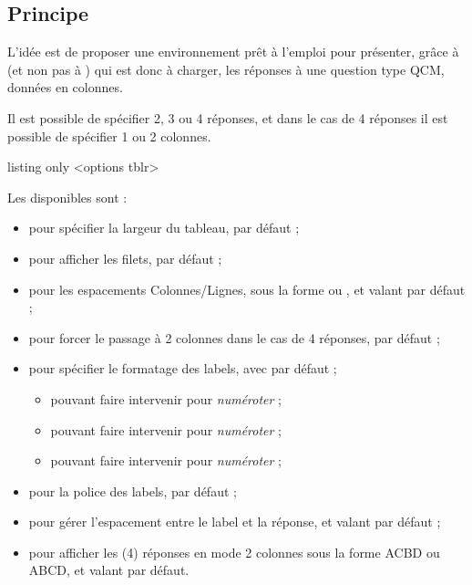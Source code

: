 \documentclass[french,11pt,a4paper]{article}
\begin{document}
\subsection{Principe}

L'idée est de proposer une environnement prêt à l'emploi pour présenter, grâce à  (et non pas à ) qui est donc à charger, les réponses à une question type QCM, données en colonnes.

\smallskip

Il est possible de spécifier 2, 3 ou 4 réponses, et dans le cas de 4 réponses il est possible de spécifier 1 ou 2 colonnes.

\begin{DemoCode}{listing only}
<options tblr>
\end{DemoCode}

Les  disponibles sont :

\begin{itemize}
	\item {} pour spécifier la largeur du tableau,  par défaut ;
	\item {} pour afficher les filets,  par défaut ;
	\item {} pour les espacements Colonnes/Lignes, sous la forme  ou , et valant \MontreCode{6pt/2pt} par défaut ;
	\item {} pour forcer le passage à 2 colonnes dans le cas de 4 réponses,  par défaut ;
	\item {} pour spécifier le formatage des labels, avec  par défaut ;
	\begin{itemize}
		\item pouvant faire intervenir  pour \textit{numéroter}  ;
		\item pouvant faire intervenir  pour \textit{numéroter}  ;
		\item pouvant faire intervenir  pour \textit{numéroter}  ;
	\end{itemize}
	\item {} pour la police des labels,  par défaut ;
	\item {} pour gérer l'espacement entre le label et la réponse, et valant  par défaut ;
	\item {} pour afficher les (4) réponses en mode 2 colonnes sous la forme ACBD ou ABCD, et valant  par défaut.
\end{itemize}
\end{document}
